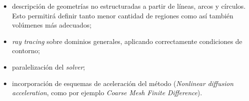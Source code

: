 \documentclass[11pt]{article}
\numberwithin{equation}{section}
\begin{document}
\begin{itemize}
\renewcommand\labelitemi{$\cdot$}
 \item descripción de geometrías no estructuradas a partir de líneas, arcos y círculos. Esto permitirá definir tanto menor cantidad de regiones como así también volúmenes más adecuados;
 \item \emph{ray tracing} sobre dominios generales, aplicando correctamente condiciones de contorno;
 \item paralelización del \emph{solver};
 \item incorporación de esquemas de aceleración del método (\emph{Nonlinear diffusion acceleration}, como por ejemplo \emph{Coarse Mesh Finite Difference}).
\end{itemize}



\pagebreak
\printbibliography
\label{lastpage}
\end{document}

